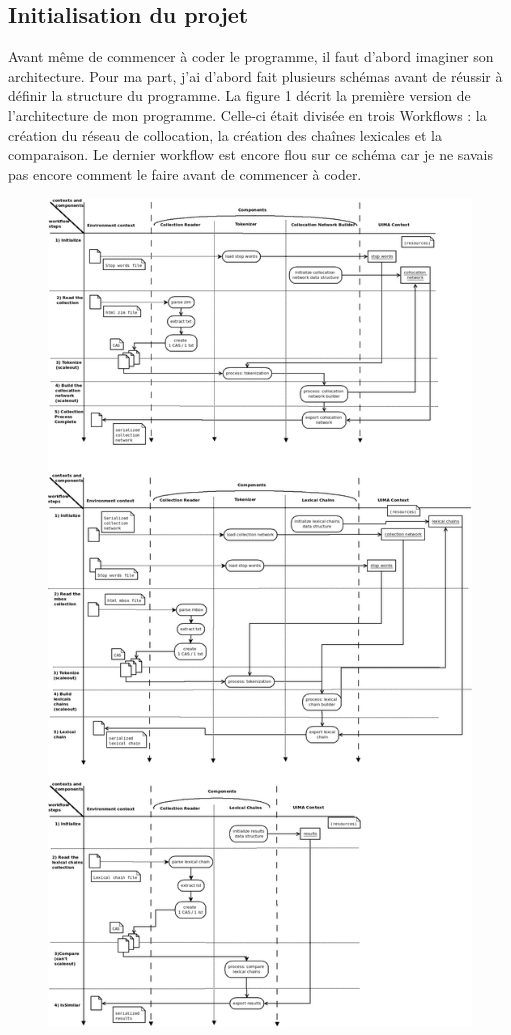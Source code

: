 \documentclass[a4paper]{article}
\begin{document}
	\subsection{Initialisation du projet}
	
	Avant même de commencer à coder le programme, il faut d'abord imaginer son architecture. Pour ma part, j'ai d'abord fait plusieurs schémas avant de réussir à définir la structure du programme. La figure 1 décrit la première version de l'architecture de mon programme. Celle-ci était divisée en trois Workflows : la création du réseau de collocation, la création des chaînes lexicales et la comparaison. Le dernier workflow est encore flou sur ce schéma car je ne savais pas encore comment le faire avant de commencer à coder. \\
	
	\begin{figure}[!]
  	\centering
  	\includegraphics[width=1\textwidth]{Figures/mondiagramme1.png}

\end{figure}
\end{document}
